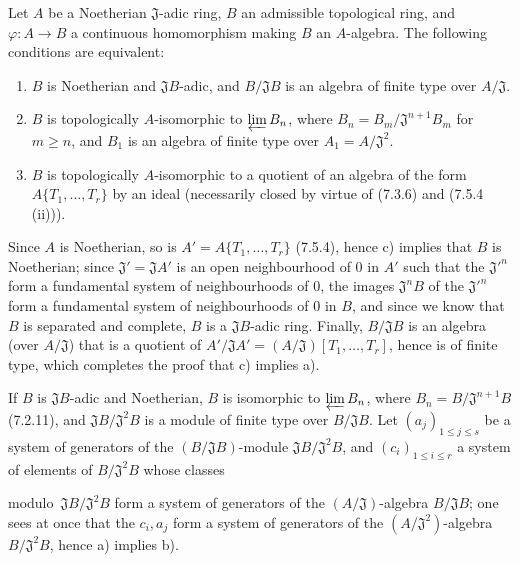 \begin{proposition}[7.5.5]
\label{0.7.5.5}
Let $A$ be a Noetherian $\mathfrak J$-adic ring, $B$ an admissible topological
ring, and $\varphi:A\to B$ a continuous homomorphism making $B$ an
$A$-algebra. The following conditions are equivalent:
\begin{enumerate}
  \item[a)] $B$ is Noetherian and $\mathfrak JB$-adic, and
  $B/\mathfrak JB$ is an algebra of finite type over $A/\mathfrak J$.

  \item[b)] $B$ is topologically $A$-isomorphic to $\varprojlim B_n$, where
  $B_n=B_m/\mathfrak J^{n+1}B_m$ for $m\geq n$, and $B_1$ is an algebra of
  finite type over $A_1=A/\mathfrak J^2$.

  \item[c)] $B$ is topologically $A$-isomorphic to a quotient of an algebra
  of the form\linebreak $A\{T_1,\ldots,T_r\}$ by an ideal (necessarily closed by virtue
  of (7.3.6) and (7.5.4 (ii))).
\end{enumerate}
\end{proposition}

Since $A$ is Noetherian, so is
$A'=A\{T_1,\ldots,T_r\}$ (7.5.4), hence c) implies that $B$ is Noetherian;
since $\mathfrak J'=\mathfrak JA'$ is an open neighbourhood of 0 in $A'$ such
that the $\mathfrak J'^{n}$ form a fundamental system of neighbourhoods of 0,
the images $\mathfrak J^nB$ of the $\mathfrak J'^{n}$ form a fundamental
system of neighbourhoods of 0 in $B$, and since we know that $B$ is separated and
complete, $B$ is a $\mathfrak JB$-adic ring. Finally, $B/\mathfrak JB$ is
an algebra (over $A/\mathfrak J$) that is a quotient of
$A'/\mathfrak JA'=(A/\mathfrak J)[T_1,\ldots,T_r]$, hence is of finite type, which
completes the proof that c) implies a).

If $B$ is $\mathfrak JB$-adic and Noetherian, $B$ is isomorphic to
$\varprojlim B_n$, where $B_n=B/\mathfrak J^{n+1}B$ (7.2.11), and
$\mathfrak JB/\mathfrak J^2B$ is a module of finite type over
$B/\mathfrak JB$. Let $(a_j)_{1\leq j\leq s}$ be a system of generators of the
$(B/\mathfrak JB)$-module $\mathfrak JB/\mathfrak J^2B$, and
$(c_i)_{1\leq i\leq r}$ a system of elements of $B/\mathfrak J^2B$ whose
classes


modulo~$\mathfrak JB/\mathfrak J^2B$ form a system of generators of the
$(A/\mathfrak J)$-algebra $B/\mathfrak JB$; one sees at once that the $c_i,a_j$
form a system of generators of the $(A/\mathfrak J^2)$-algebra
$B/\mathfrak J^2B$, hence a) implies b).

